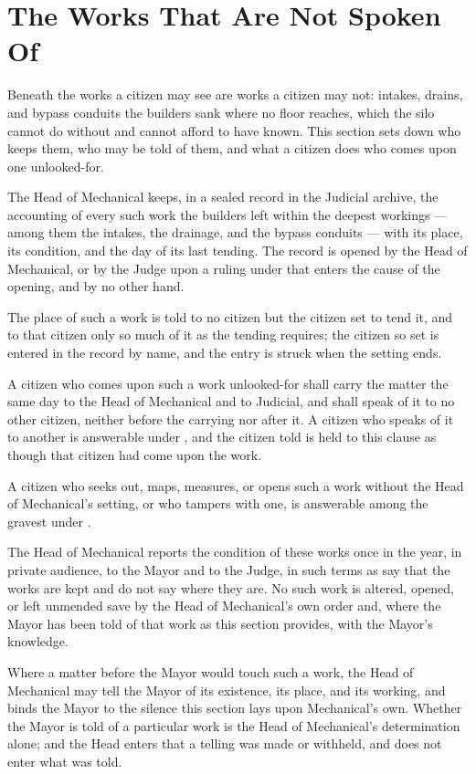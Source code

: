 \section{The Works That Are Not Spoken Of}
\label{sec:mechanical:works-that-are-not-spoken-of}

Beneath the works a citizen may see are works a citizen may not: intakes, drains, and bypass conduits the builders sank where no floor reaches, which the silo cannot do without and cannot afford to have known. This section sets down who keeps them, who may be told of them, and what a citizen does who comes upon one unlooked-for.

\begin{clauses}
\item The Head of Mechanical keeps, in a sealed record in the Judicial archive, the accounting of every such work the builders left within the deepest workings --- among them the intakes, the drainage, and the bypass conduits --- with its place, its condition, and the day of its last tending. The record is opened by the Head of Mechanical, or by the Judge upon a ruling under  that enters the cause of the opening, and by no other hand.
\item The place of such a work is told to no citizen but the citizen set to tend it, and to that citizen only so much of it as the tending requires; the citizen so set is entered in the record by name, and the entry is struck when the setting ends.
\item A citizen who comes upon such a work unlooked-for shall carry the matter the same day to the Head of Mechanical and to Judicial, and shall speak of it to no other citizen, neither before the carrying nor after it. A citizen who speaks of it to another is answerable under , and the citizen told is held to this clause as though that citizen had come upon the work.
\item A citizen who seeks out, maps, measures, or opens such a work without the Head of Mechanical's setting, or who tampers with one, is answerable among the gravest under .
\item The Head of Mechanical reports the condition of these works once in the year, in private audience, to the Mayor and to the Judge, in such terms as say that the works are kept and do not say where they are. No such work is altered, opened, or left unmended save by the Head of Mechanical's own order and, where the Mayor has been told of that work as this section provides, with the Mayor's knowledge.
\item Where a matter before the Mayor would touch such a work, the Head of Mechanical may tell the Mayor of its existence, its place, and its working, and binds the Mayor to the silence this section lays upon Mechanical's own. Whether the Mayor is told of a particular work is the Head of Mechanical's determination alone; and the Head enters that a telling was made or withheld, and does not enter what was told.
\end{clauses}

